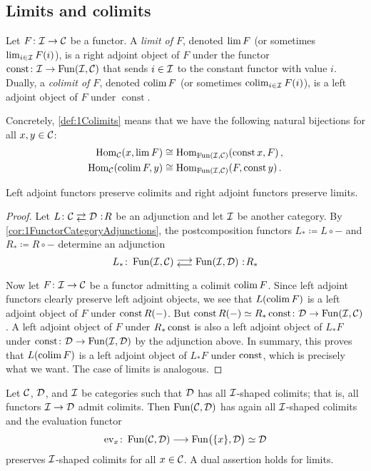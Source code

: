\subsection{Limits and colimits}
\begin{defi}\label{def:1Colimits}
	Let $F\colon \mathcal{I}\rightarrow \mathcal{C}$ be a functor. A \emph{limit of $F$}, denoted $\operatorname*{lim} F$ (or sometimes $\operatorname*{lim}_{i\in\mathcal{I}}F(i)$), is a right adjoint object of $F$ under the functor $\operatorname{const}\colon\mathcal{I}\rightarrow \operatorname{Fun}(\mathcal{I},\mathcal{C})$ that sends $i\in\mathcal{I}$ to the constant functor with value $i$. Dually, a \emph{colimit of $F$}, denoted $\operatorname*{colim} F$ (or sometimes $\operatorname*{colim}_{i\in\mathcal{I}}F(i)$), is a left adjoint object of $F$ under $\operatorname{const}$.
\end{defi}
Concretely, \cref{def:1Colimits} means that we have the following natural bijections for all $x,y\in \mathcal{C}$:
\begin{align*}
	\operatorname{Hom}_{\mathcal{C}}(x,\operatorname*{lim} F)&\cong \operatorname{Hom}_{\operatorname{Fun}(\mathcal{I},\mathcal{C})}(\operatorname{const}x,F)\,,\\ \operatorname{Hom}_{\mathcal{C}}(\operatorname*{colim} F,y)&\cong \operatorname{Hom}_{\operatorname{Fun}(\mathcal{I},\mathcal{C})}(F,\operatorname{const}y)\,.
\end{align*}
\begin{lem}\label{lem:1AdjointsPreserveColimits}
	Left adjoint functors preserve colimits and right adjoint functors preserve limits.
\end{lem}
\begin{proof}
	Let $L\colon \Cc \shortdoublelrmorphism \Dd\noloc R$ be an adjunction and let $\mathcal{I}$ be another category. By \cref{cor:1FunctorCategoryAdjunctions}, the postcomposition functors $L_*\coloneqq L\circ -$ and $R_*\coloneqq R\circ -$ determine an adjunction
	\begin{equation*}
		L_*\colon \Fun(\Ii,\Cc)\doublelrmorphism \Fun(\Ii,\Dd)\noloc R_*
	\end{equation*}
	Now let $F\colon \mathcal{I}\rightarrow \mathcal{C}$ be a functor admitting a colimit $\operatorname*{colim} F$. Since left adjoint functors clearly preserve left adjoint objects, we see that $L(\operatorname*{colim} F)$ is a left adjoint object of $F$ under $\operatorname{const} R(-)$. But $\operatorname{const} R(-)\simeq R_*\operatorname{const}\colon \mathcal{D}\rightarrow \operatorname{Fun}(\mathcal{I},\mathcal{C})$. A left adjoint object of $F$ under $R_*\operatorname{const}$ is also a left adjoint object of $L_*F$ under $\operatorname{const}\colon \mathcal{D}\rightarrow \operatorname{Fun}(\mathcal{I},\mathcal{D})$ by the adjunction above. In summary, this proves that $L(\operatorname*{colim} F)$ is a left adjoint object of $L_*F$ under $\operatorname{const}$, which is precisely what we want. The case of limits is analogous.
\end{proof}
\begin{lem}\label{lem:1ColimitsInFunctorCategories}
	Let $\mathcal{C}$, $\mathcal{D}$, and $\mathcal{I}$ be categories such that $\mathcal{D}$ has all $\mathcal{I}$-shaped colimits; that is, all functors $\mathcal{I}\rightarrow \mathcal{D}$ admit colimits. Then $\operatorname{Fun}(\mathcal{C},\mathcal{D})$ has again all $\mathcal{I}$-shaped colimits and the evaluation functor 
	\begin{equation*}
		\ev_x\colon \Fun(\Cc,\Dd)\longrightarrow \Fun\lef(\{x\},\Dd\righ)\simeq \Dd
	\end{equation*}
	preserves $\mathcal{I}$-shaped colimits for all $x\in \mathcal{C}$. A dual assertion holds for limits.
\end{lem}
